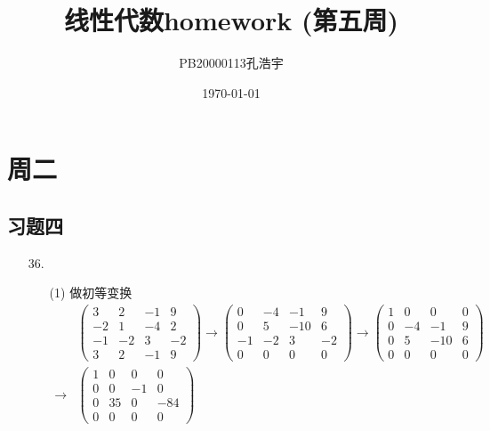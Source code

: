\documentclass{article}
\title{线性代数homework (第五周)}
\author{PB20000113孔浩宇}
\date{\today}
\begin{document}
\maketitle
\section{周二}
\subsection{习题四}
    \begin{enumerate}
        \item [36.]
        \begin{enumerate}
            \item [(1)]做初等变换
            \begin{align*}
                &\begin{pmatrix}
                    3  & 2 & -1 & 9\\
                    -2 & 1 & -4 & 2\\
                    -1 & -2& 3  & -2\\
                    3  & 2 & -1 & 9
                \end{pmatrix}
                \longrightarrow 
                \begin{pmatrix}
                    0 & -4 & -1 & 9\\
                    0 & 5  & -10& 6\\
                    -1& -2 & 3 & -2\\
                    0 & 0 & 0 & 0
                \end{pmatrix}
                \longrightarrow
                \begin{pmatrix}
                    1 & 0 & 0 & 0\\
                    0 & -4 & -1 & 9\\
                    0 & 5 & -10 & 6\\
                    0 & 0 & 0 & 0
                \end{pmatrix}\\
                \longrightarrow
                &\begin{pmatrix}
                    1 & 0 & 0 & 0\\
                    0 & 0 & -1 & 0\\
                    0 & 35 & 0 & -84\\
                    0 & 0 & 0 & 0
                \end{pmatrix}

\end{align*}
\end{enumerate}
\end{enumerate}
\end{document}
